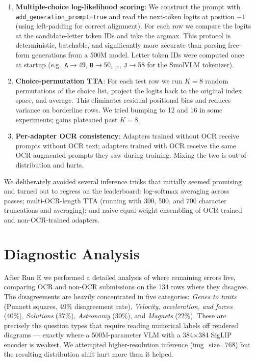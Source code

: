 \documentclass[11pt]{article}
\begin{document}
\begin{enumerate}
    \item \textbf{Multiple-choice log-likelihood scoring}: We construct the prompt with \texttt{add\_generation\_prompt=True} and read the next-token logits at position $-1$ (using left-padding for correct alignment). For each row we compare the logits at the candidate-letter token IDs and take the argmax. This protocol is deterministic, batchable, and significantly more accurate than parsing free-form generations from a 500M model. Letter token IDs were computed once at startup (e.g.\ \texttt{A}$\to$49, \texttt{B}$\to$50, \dots, \texttt{J}$\to$58 for the SmolVLM tokenizer).
    \item \textbf{Choice-permutation TTA}: For each test row we run $K{=}8$ random permutations of the choice list, project the logits back to the original index space, and average. This eliminates residual positional bias and reduces variance on borderline rows. We tried bumping to 12 and 16 in some experiments; gains plateaued past $K{=}8$.
    \item \textbf{Per-adapter OCR consistency}: Adapters trained without OCR receive prompts without OCR text; adapters trained with OCR receive the same OCR-augmented prompts they saw during training. Mixing the two is out-of-distribution and hurts.
\end{enumerate}

We deliberately avoided several inference tricks that initially seemed promising and turned out to regress on the leaderboard: log-softmax averaging across passes; multi-OCR-length TTA (running with 300, 500, and 700 character truncations and averaging); and naive equal-weight ensembling of OCR-trained and non-OCR-trained adapters.

\section{Diagnostic Analysis}

After Run E we performed a detailed analysis of where remaining errors live, comparing OCR and non-OCR submissions on the 134 rows where they disagree. The disagreements are heavily concentrated in five categories: \emph{Genes to traits} (Punnett squares, 49\% disagreement rate), \emph{Velocity, acceleration, and forces} (40\%), \emph{Solutions} (37\%), \emph{Astronomy} (30\%), and \emph{Magnets} (22\%). These are precisely the question types that require reading numerical labels off rendered diagrams --- exactly where a 500M-parameter VLM with a 384$\times$384 SigLIP encoder is weakest. We attempted higher-resolution inference (img\_size=768) but the resulting distribution shift hurt more than it helped.
\end{document}
